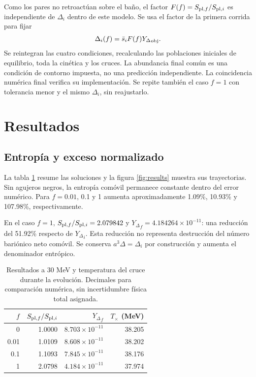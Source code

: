 \documentclass[10pt,twocolumn,a4paper]{article}
\newcommand{\Y}{{Y_\Delta}}
\newcommand{\sbar}{\bar s}
\begin{document}
Como los pares no retroactúan sobre el baño, el factor $F(f)=S_{{\rm pl},f}/S_{{\rm pl},i}$ es independiente de $\Delta_i$ dentro de este modelo. Se usa el factor de la primera corrida para fijar
\begin{equation}\label{eq:boundary}
\Delta_i(f)=\sbar_i F(f)\Y_{\rm obj}.
\end{equation}
Se reintegran las cuatro condiciones, recalculando las poblaciones iniciales de equilibrio, toda la cinética y los cruces. La abundancia final común es una condición de contorno impuesta, no una predicción independiente. La coincidencia numérica final verifica su implementación. Se repite también el caso $f=1$ con tolerancia menor y el mismo $\Delta_i$, sin reajustarlo.

\section{Resultados}
\subsection{Entropía y exceso normalizado}
La tabla \ref{tab:results} resume las soluciones y la figura \ref{fig:results} muestra sus trayectorias. Sin agujeros negros, la entropía comóvil permanece constante dentro del error numérico. Para $f=0.01$, 0.1 y 1 aumenta aproximadamente 1.09\%, 10.93\% y 107.98\%, respectivamente.

En el caso $f=1$, $S_{{\rm pl},f}/S_{{\rm pl},i}=2.079842$ y $\Y_f=4.184264\times10^{-11}$: una reducción del 51.92\% respecto de $\Y_i$. Esta reducción no representa destrucción del número bariónico neto comóvil. Se conserva $a^3\Delta=\Delta_i$ por construcción y aumenta el denominador entrópico.

\begin{table}[t]
\centering\small
\caption{Resultados a 30 MeV y temperatura del cruce durante la evolución. Decimales para comparación numérica, sin incertidumbre física total asignada.}\label{tab:results}
\begin{tabular}{rrrr}\toprule
$f$&$S_{{\rm pl},f}/S_{{\rm pl},i}$&$\Y_f$&$T_\times$ (MeV)\\\midrule
0&1.0000&$8.703\times10^{-11}$&38.205\\
0.01&1.0109&$8.608\times10^{-11}$&38.202\\
0.1&1.1093&$7.845\times10^{-11}$&38.176\\
1&2.0798&$4.184\times10^{-11}$&37.974\\\bottomrule
\end{tabular}
\end{table}
\end{document}
